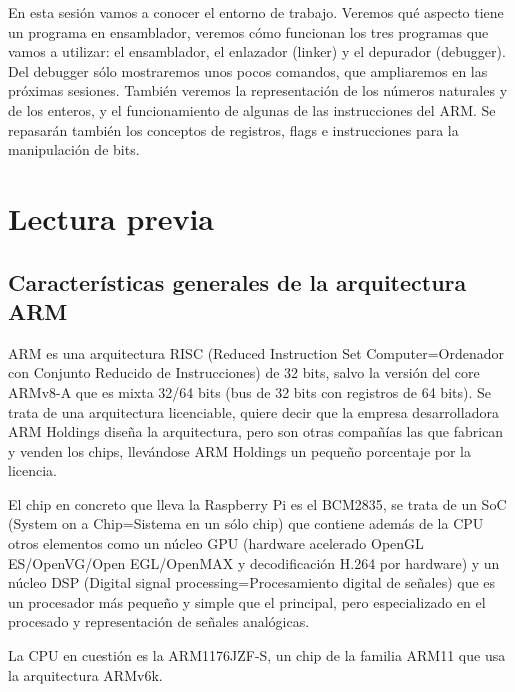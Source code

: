 \label{chp:IntrEnsam}
\minitoc

\begin{objetivo}
En esta sesión vamos a conocer el entorno de trabajo. Veremos qué aspecto tiene un programa en ensamblador, veremos cómo funcionan los tres programas que vamos a utilizar: el ensamblador, el enlazador (linker) y el depurador (debugger). Del debugger sólo mostraremos unos pocos comandos, que ampliaremos en las próximas sesiones. También veremos la representación de los números naturales y de los enteros, y el funcionamiento de algunas de las instrucciones del ARM. Se repasarán también los conceptos de registros, flags e instrucciones para la manipulación de bits.
\end{objetivo}

\section{Lectura previa}
\label{sec:LectPrev}

\subsection{Características generales de la arquitectura ARM}
\label{sec:CaracGen}

ARM es una arquitectura RISC (Reduced Instruction Set Computer=Ordenador con Conjunto Reducido de Instrucciones) de 32 bits, salvo la versión del core ARMv8-A que es mixta 32/64 bits (bus de 32 bits con registros de 64 bits). Se trata de una arquitectura licenciable, quiere decir que la empresa desarrolladora ARM Holdings diseña la arquitectura, pero son otras compañías las que fabrican y venden los chips, llevándose ARM Holdings un pequeño porcentaje por la licencia.

El chip en concreto que lleva la Raspberry Pi es el BCM2835, se trata de un SoC (System on a Chip=Sistema en un sólo chip) que contiene además de la CPU otros elementos como un núcleo GPU (hardware acelerado OpenGL ES/OpenVG/Open EGL/OpenMAX y decodificación H.264 por hardware) y un núcleo DSP (Digital signal processing=Procesamiento digital de señales) que es un procesador más pequeño y simple que el principal, pero especializado en el procesado y representación de señales analógicas.

La CPU en cuestión es la ARM1176JZF-S, un chip de la familia ARM11 que usa la arquitectura ARMv6k. 

